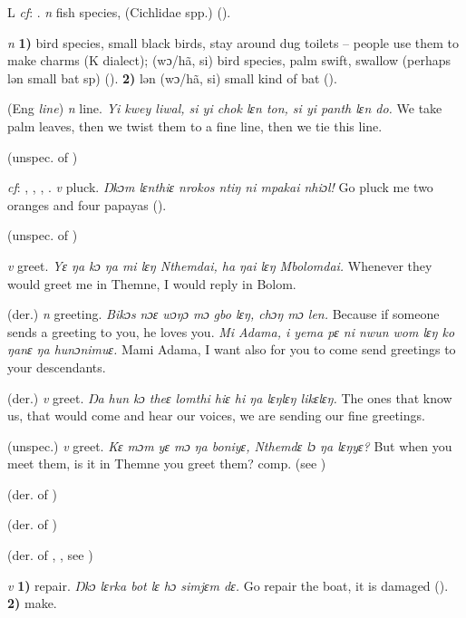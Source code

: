 \begin{letter}{L}
 \textit{cf}: . \textit{n} fish species, (Cichlidae spp.) (\citealt{Pichl1967}). 

 \textit{n} \textbf{1)} bird species, small black birds, stay around dug toilets – people use them to make charms (K dialect); (wɔ/hã, si) bird species, palm swift, swallow (perhaps lən small bat sp) (\citealt{Pichl1967}). \textbf{2)} lən (wɔ/hã, si) small kind of bat (\citealt{Pichl1967}). 

 (Eng \textit{line}) \textit{n} line. \textit{Yi kwey liwal, si yi chok lɛn ton, si yi panth lɛn do.} We take palm leaves, then we twist them to a fine line, then we tie this line.

 (unspec. of ) 

 \textit{cf}: , , , . \textit{v} pluck. \textit{Ŋkɔm lɛnthiɛ nrokos ntiŋ ni mpakai nhiɔl!} Go pluck me two oranges and four papayas (\citealt{Pichl1967}).

 (unspec. of ) 

 \textit{v} greet. \textit{Yɛ ŋa kɔ ŋa mi lɛŋ Nthemdai, ha ŋai lɛŋ Mbolomdai.} Whenever they would greet me in Themne, I would reply in Bolom.

 (der.) \textit{n} greeting. \textit{Bikɔs nɔɛ wɔŋɔ mɔ gbo lɛŋ, chɔŋ mɔ len.} Because if someone sends a greeting to you, he loves you. \textit{Mi Adama, i yema pɛ ni nwun wom lɛŋ ko ŋanɛ ŋa hunɔnimuɛ.} Mami Adama, I want also for you to come send greetings to your descendants.

 (der.) \textit{v} greet. \textit{Ŋa hun kɔ theɛ lomthi hiɛ hi ŋa lɛŋlɛŋ likɛlɛŋ.} The ones that know us, that would come and hear our voices, we are sending our fine greetings.

 (unspec.) \textit{v} greet. \textit{Kɛ mɔm yɛ mɔ ŋa boniyɛ, Nthemdɛ lɔ ŋa lɛŋyɛ?} But when you meet them, is it in Themne you greet them? comp.  (see ) 

 (der. of ) 

 (der. of ) 

 (der. of , , see ) 

 \textit{v} \textbf{1)} repair.\textit{ Ŋkɔ lɛrka bot lɛ hɔ simjɛm dɛ.} Go repair the boat, it is damaged (\citealt{Pichl1967}). \textbf{2)} make.


\end{letter}
